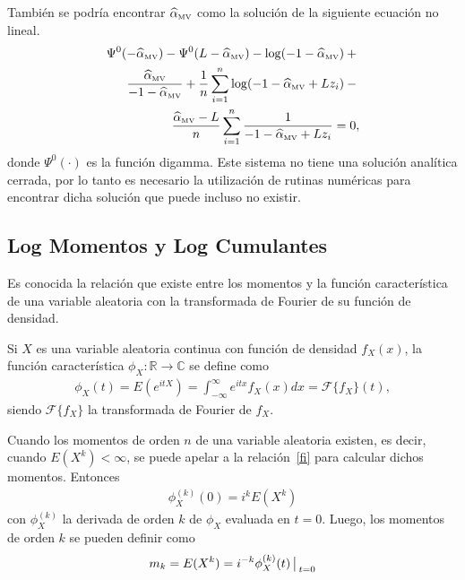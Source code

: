 También se podría encontrar $\widehat{\alpha}_{{\text{\tiny{MV}}}}$ como la solución de la siguiente ecuación no lineal.
\begin{align}
\label{rootML}
\Psi^0(-\widehat{\alpha}_{{\text{\tiny{MV}}}})-\Psi^0(L-\widehat{\alpha}_{{\text{\tiny{MV}}}})-\log(-1-\widehat{\alpha}_{{\text{\tiny{MV}}}})+{} \nonumber\\
\frac{\widehat{\alpha}_{{\text{\tiny{MV}}}}}{-1-\widehat{\alpha}_{{\text{\tiny{MV}}}}}+
\frac{1}{n}\sum_{i=1}^n{\log(-1-\widehat{\alpha}_{{\text{\tiny{MV}}}}+Lz_i)}-{}
\nonumber
\\ \frac{\widehat{\alpha}_{{\text{\tiny{MV}}}}-L}{n}\sum_{i=1}^n \frac1{-1-\widehat{\alpha}_{{\text{\tiny{MV}}}}+Lz_i}= 0, 
\end{align}
donde $\Psi^0(\cdot)$ es la función digamma. Este sistema no tiene una solución analítica cerrada, por lo tanto es necesario la utilización de rutinas numéricas para encontrar dicha solución que puede incluso no existir.

\subsection{Log Momentos y Log Cumulantes}

Es conocida la relación que existe entre los momentos y la función característica de una variable aleatoria con la transformada de Fourier de su función de densidad. 

\begin{definition}
Si $X$ es una variable aleatoria continua con función de densidad $f_X(x)$, la función característica $\phi_X\colon \mathbb{R} \rightarrow \mathbb{C}$ se define como 
\begin{align}
\phi_X(t)=E(e^{itX})=\int_{-\infty}^{\infty} e^{itx} f_X(x) dx = \mathcal{F}\{f_X\}(t),
\label{fi}
\end{align}
siendo $\mathcal{F}\{f_X\}$ la transformada de Fourier de $f_X$.
\end{definition}

Cuando los momentos de orden $n$ de una variable aleatoria existen, es decir, cuando $E(X^k)< \infty$, se puede apelar a la relación~\eqref{fi} para calcular dichos momentos. Entonces
\begin{align}
\phi_X^{(k)}(0)=i^k E(X^k)
\label{fi}
\end{align}
con $\phi_X^{(k)}$ la derivada de orden $k$ de $\phi_X$ evaluada en $t=0$. Luego, los momentos de orden $k$ se pueden definir como 
\begin{align}
\label{MomentosPrimerTipo}
m_k=E(X^k)=i^{-k} \phi_X^{(k)}(t)\big\arrowvert _{t=0}
\end{align}

